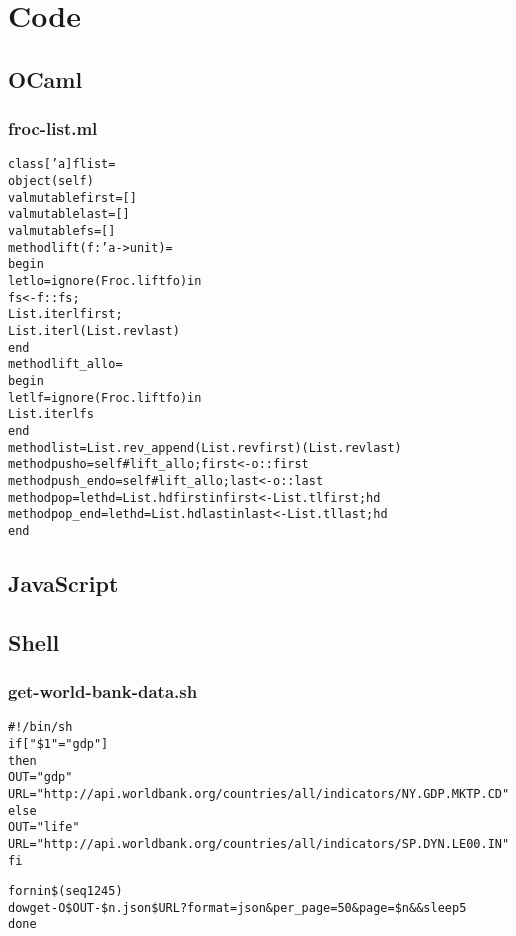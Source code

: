 \chapter{Code}

\section{OCaml}
\subsection{froc-list.ml}
\label{app:froc-list}
\begin{alltt}
class ['a] flist =
object (self)
  val mutable first = []
  val mutable last = []
  val mutable fs = []
  method lift (f : 'a -> unit) = 
    begin
      let l o = ignore (Froc.lift f o) in
      fs <- f :: fs;
      List.iter l first;
      List.iter l (List.rev last)
    end
  method lift_all o =
    begin
      let l f = ignore (Froc.lift f o) in
      List.iter l fs
    end
  method list = List.rev_append (List.rev first) (List.rev last)
  method push o = self#lift_all o; first <- o :: first
  method push_end o = self#lift_all o; last <- o :: last
  method pop = let hd = List.hd first in first <- List.tl first; hd
  method pop_end = let hd = List.hd last in last <- List.tl last; hd
end
\end{alltt}
\section{JavaScript}

\section{Shell}
\subsection{get-world-bank-data.sh}
\label{app:data}
\begin{alltt}
#!/bin/sh
if [ "\$1" = "gdp" ]
then
  OUT="gdp"
  URL="http://api.worldbank.org/countries/all/indicators/NY.GDP.MKTP.CD"
else
  OUT="life"
  URL="http://api.worldbank.org/countries/all/indicators/SP.DYN.LE00.IN"
fi

for n in \$(seq 1 245)
  do wget -O \${OUT}-\${n}.json \${URL}?format=json\&per_page=50\&page=\${n} && sleep 5
done
\end{alltt}
